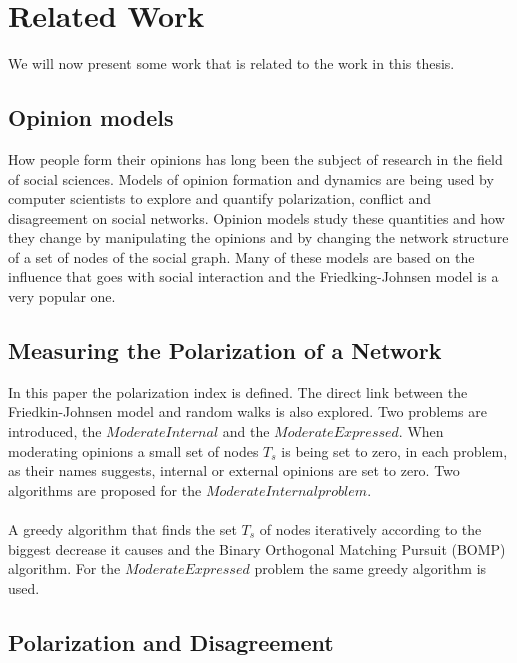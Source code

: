 \chapter{Related Work}
\label{ch:Instructions}

We will now present some work that is related to the work in this thesis. 

\section{Opinion models}
\label{sec:opinionsModels}

How people form their opinions has long been the subject of research in the field of social sciences. Models of opinion formation and dynamics are being used  by computer scientists to explore and quantify polarization, conflict and disagreement on social networks. Opinion models study these quantities and how they change by manipulating the opinions and by changing the network structure of a set of nodes of the social graph. Many of these models are based on the influence that goes with social interaction and the Friedking-Johnsen model is a very popular one.
\clearpage

\section{Measuring the Polarization of a Network}
\label{sec:Submission}

In this paper the polarization index is defined\cite{tsapMatakosTerzi}. The direct link between the Friedkin-Johnsen model and random walks is also explored. Two problems are introduced, the $ModerateInternal$ and the $ModerateExpressed$. When moderating opinions a small set of nodes $T_s$ is being set to zero, in each problem, as their names suggests, internal or external opinions are set to zero. Two algorithms are proposed for the $ModerateInternal problem$. 
\\
\\
A greedy algorithm that finds the set $T_s$ of nodes iteratively according to the biggest decrease it causes and the Binary Orthogonal Matching Pursuit (BOMP) algorithm. For the $ModerateExpressed$ problem the same greedy algorithm is used.


\section{Polarization and Disagreement}
\label{sec:polarizationDisareement}

